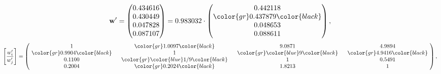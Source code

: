 \begin{example}
\begin{equation*}
\mathbf{w}^{\prime} =
\begin{pmatrix}
0.434616\\
0.430449\\
0.047828\\
0.087107
\end{pmatrix} =
0.983032\cdot
\begin{pmatrix}
0.442118\\
\color{gr} 0.437879\color{black} \\
0.048653\\
0.088611
\end{pmatrix},
\end{equation*}
\begin{equation*}
\left[ \frac{{w}^{\prime}_i}{{w}^{\prime}_j} \right] =
\begin{pmatrix}
$\,\,$ 1 $\,\,$ & $\,\,$\color{gr} 1.0097\color{black} $\,\,$ & $\,\,$9.0871$\,\,$ & $\,\,$4.9894$\,\,$ \\
$\,\,$\color{gr} 0.9904\color{black} $\,\,$ & $\,\,$ 1 $\,\,$ & $\,\,$\color{gr} \color{blue} 9\color{black} $\,\,$ & $\,\,$\color{gr} 4.9416\color{black}   $\,\,$ \\
$\,\,$0.1100$\,\,$ & $\,\,$\color{gr} \color{blue}  1/9\color{black} $\,\,$ & $\,\,$ 1 $\,\,$ & $\,\,$0.5491 $\,\,$ \\
$\,\,$0.2004$\,\,$ & $\,\,$\color{gr} 0.2024\color{black} $\,\,$ & $\,\,$1.8213$\,\,$ & $\,\,$ 1  $\,\,$ \\
\end{pmatrix},
\end{equation*}
\end{example}
\newpage
